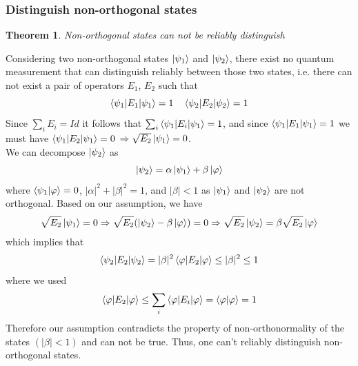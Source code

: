 \documentclass{article}
\newtheorem{theorem}{Theorem}
\begin{document}
\subsubsection*{Distinguish non-orthogonal states}
\begin{theorem}
    Non-orthogonal states can not be reliably distinguish
\end{theorem}
Considering two non-orthogonal states $\ket{\psi_1}$ and $\ket{\psi_2}$, there
exist no quantum measurement that can distinguish reliably between those two
states, i.e. there can not exist a pair of operators $E_1$, $E_2$ such that
\begin{equation}
    \braket{\psi_1|E_1|\psi_1} = 1 \quad \braket{\psi_2|E_2|\psi_2} = 1
\end{equation}
Since $\sum_iE_i=Id$ it follows that $\sum_i\braket{\psi_1|E_i|\psi_1}=1$, and
since $\braket{\psi_1|E_1|\psi_1} = 1$ we must have $\braket{\psi_1|E_2
|\psi_1} = 0$ $\Rightarrow \sqrt{E_2}\ket{\psi_1}=0$. \\\noindent We can
decompose $\ket{\psi_2}$ as
\begin{equation}
    \ket{\psi_2} = \alpha\ket{\psi_1}+\beta\ket{\varphi}
\end{equation}
where $\braket{\psi_1|\varphi}=0$, $|\alpha|^2 +|\beta|^2 = 1$, and $|\beta|<1$
as $\ket{\psi_1}$ and $\ket{\psi_2}$ are not orthogonal. Based on our
assumption, we have
\begin{equation}
    \begin{aligned}
        \sqrt{E_2}\ket{\psi_1} = 0
        \Rightarrow \sqrt{E_2}(\ket{\psi_2} - \beta\ket{\varphi}) = 0
        \Rightarrow \sqrt{E_2}\ket{\psi_2} = \beta\sqrt{E_2}\ket{\varphi}
    \end{aligned}
\end{equation}
which implies that
\begin{equation}
    \braket{\psi_2|E_2|\psi_2} = |\beta|^2 \braket{\varphi|E_2|\varphi} \leq |\beta|^2 \leq 1
\end{equation}
where we used
\begin{equation}
\braket{\varphi|E_2|\varphi} \leq \sum_i\braket{\varphi|E_i|\varphi} = \braket{\varphi|\varphi} = 1
\end{equation}
Therefore our assumption contradicts the property of non-orthonormality of the
states $(|\beta|<1)$ and can not be true. Thus, one can't reliably distinguish
non-orthogonal states.
\end{document}
